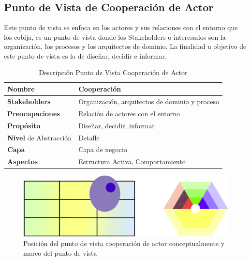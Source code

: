     \subsection{Punto de Vista de Cooperación de Actor}
    Este punto de vista se enfoca en los actores y sus relaciones con el entorno que los cobija, es un punto de vista donde los Stakeholders o interesados son la organización, los   procesos y los arquitectos de dominio. La finalidad u objetivo de este punto de vista es la de diseñar, decidir e informar. \cite{ref9}
    \begin{table}[h]
      \centering
      \begin{tabular}{p{3.7cm}p{8cm}}
        \hline
        \textbf{Nombre} & \textbf{Cooperación} \\
        \hline
        \textbf{Stakeholders} & Organización, arquitectos de dominio y proceso \\
        \textbf{Preocupaciones} & Relación de actores con el entorno \\
        \textbf{Propósito} & Diseñar, decidir, informar \\
        \textbf{Nivel} de Abstracción & Detalle \\
        \textbf{Capa} & Capa de negocio \\
        \textbf{Aspectos} & Estructura Activa, Comportamiento \\
      \end{tabular}
      \caption{Descripción Punto de Vista Cooperación de Actor \cite{ref9}}
      \label{tabla5}
    \end{table}
    \begin{figure}[h]
      \centering
      \includegraphics[scale=0.2]{Imagenes/Figuras/15}
      \caption{Posición del punto de vista cooperación de actor conceptualmente y marco del punto de vista \cite{ref9}}
      \label{figura15}
    \end{figure}
